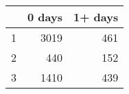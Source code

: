 \begin{table}[ht]
\centering
\begin{tabular}{rrr}
  \hline
 & 0 days & 1+ days \\ 
  \hline
1 & 3019 & 461 \\ 
  2 & 440 & 152 \\ 
  3 & 1410 & 439 \\ 
   \hline
\end{tabular}
\end{table}
